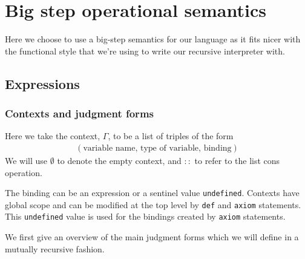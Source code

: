 \documentclass{article}
\begin{document}
\section{Big step operational semantics}
Here we choose to use a big-step semantics for our language as it fits nicer
with the functional style that we're using to write our recursive interpreter with.
\begin{comment}
  https://www.andres-loeh.de/LambdaPi/LambdaPi.pdf
  http://math.andrej.com/2012/11/08/how-to-implement-dependent-type-theory-i/
  
  http://fsl.cs.illinois.edu/images/archive/b/b3/20110221180817!CS522-Spring-2011-PL-book-bigstep.pdf
  https://www.cs.cornell.edu/courses/cs4110/2010fa/lectures/lecture03.pdf
\end{comment}

\subsection{Expressions}
\subsubsection{Contexts and judgment forms}
Here we take the context, $\Gamma$, to be a list of triples of the form
\begin{align*}
  (\text{variable name}, \, \text{type of variable}, \, \text{binding})
\end{align*}
We will use $\emptyset$ to denote the empty context, and $::$ to refer to the
list cons operation.

The binding can be an expression or a sentinel value \verb|undefined|.
Contexts have global scope and can be modified at the top level by \verb|def|
and \verb|axiom| statements. This \verb|undefined| value is used for the
bindings created by \verb|axiom| statements.

We first give an overview of the main judgment forms which we will define in a
mutually recursive fashion.
\end{document}
